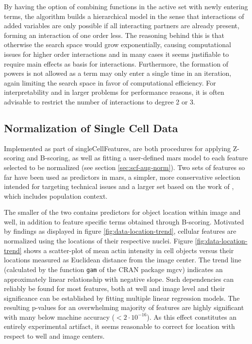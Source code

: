By having the option of combining functions in the active set with newly entering terms, the algorithm builds a hierarchical model in the sense that interactions of added variables are only possible if all interacting partners are already present, forming an interaction of one order less. The reasoning behind this is that otherwise the search space would grow exponentially, causing computational issues for higher order interactions and in many cases it seems justifiable to require main effects as basis for interactions. Furthermore, the formation of powers is not allowed as a term may only enter a single time in an iteration, again limiting the search space in favor of computational efficiency. For interpretability and in larger problems for performance reasons, it is often advisable to restrict the number of interactions to degree 2 or 3.

\subsection{Normalization of Single Cell Data}
Implemented as part of singleCellFeatures, are both procedures for applying Z-scoring and B-scoring, as well as fitting a user-defined \gls{mars} model to each feature selected to be normalized (see section \ref{sec:scf-aug-norm}). Two sets of features so far have been used as predictors in \gls{mars}, a simpler, more conservative selection intended for targeting technical issues and a larger set based on the work of \cite{Knapp2011}, which includes population context.



The smaller of the two contains predictors for object location within image and well, in addition to feature specific terms obtained through B-scoring. Motivated by findings as displayed in figure \ref{fig:data-location-trend}, cellular features are normalized using the locations of their respective nuclei. Figure \ref{fig:data-location-trend} shows a scatter-plot of mean actin intensity in cell objects versus their locations measured as Euclidean distance from the image center. The trend line (calculated by the function \texttt{gam} of the CRAN package mgcv) indicates an approximately linear relationship with negative slope. Such dependencies can reliably be found for most features, both at well and image level and their significance can be established by fitting multiple linear regression models. The resulting p-values for an overwhelming majority of features are highly significant with many below machine accuracy ($<2\cdot10^{-16}$). As this effect constitutes an entirely experimental artifact, it seems reasonable to correct for location with respect to well and image centers.

